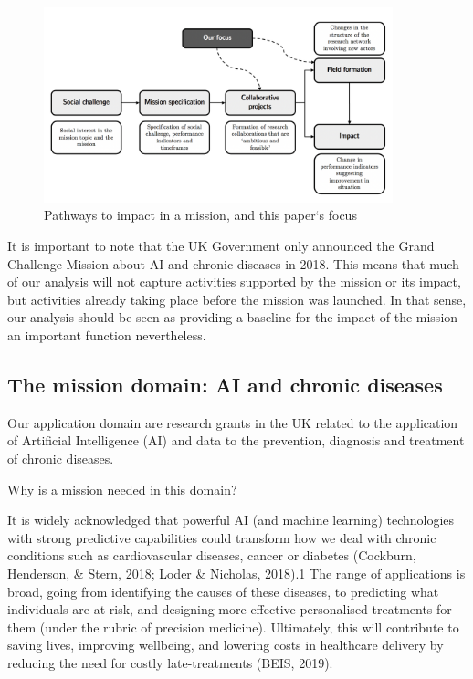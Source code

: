 \documentclass[11pt]{article}
\begin{document}
\begin{figure}[!ht]
    \centering
    \includegraphics[width=0.9\textwidth]{figures/fig_2_diagram.png}
    \caption{Pathways to impact in a mission, and this paper`s focus}
    \label{fig:diagram}
\end{figure}

It is important to note that the UK Government only announced the Grand Challenge Mission about AI and chronic diseases in 2018. This means that much of our analysis will not capture activities supported by the mission or its impact, but activities already taking place before the mission was launched. In that sense, our analysis should be seen as providing a baseline for the impact of the mission - an important function nevertheless.

\subsection{The mission domain: AI and chronic diseases}
\label{subsec: domain}

Our application domain are research grants in the UK related to the application of Artificial Intelligence (AI) and data to the prevention, diagnosis and treatment of chronic diseases. 

Why is a mission needed in this domain? 

It is widely acknowledged that powerful AI (and machine learning) technologies with strong predictive capabilities could transform how we deal with chronic conditions such as cardiovascular diseases, cancer or diabetes (Cockburn, Henderson, \& Stern, 2018; Loder \& Nicholas, 2018).1 The range of applications is broad, going from identifying the causes of these diseases, to predicting what individuals are at risk, and designing more effective personalised treatments for them (under the rubric of precision medicine). Ultimately, this will contribute to saving lives, improving wellbeing, and lowering costs in healthcare delivery by reducing the need for costly late-treatments (BEIS, 2019).
\end{document}
